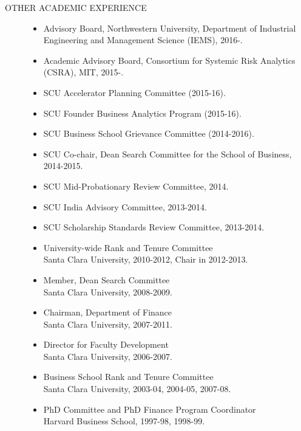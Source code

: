 \documentclass{article}
\begin{document}
\begin{description} 
\item[OTHER ACADEMIC EXPERIENCE] \mbox{}

\begin{itemize}
\setlength\itemsep{-0.1em}

\item Advisory Board, Northwestern University, Department of Industrial Engineering and Management Science (IEMS), 2016-. 

\item Academic Advisory Board, Consortium for Systemic Risk Analytics (CSRA), MIT, 2015-.

\item SCU Accelerator Planning Committee (2015-16). 

\item SCU Founder Business Analytics Program (2015-16). 

\item SCU Business School Grievance Committee (2014-2016). 

\item SCU Co-chair, Dean Search Committee for the School of Business, 2014-2015.

\item SCU Mid-Probationary Review Committee, 2014.

\item SCU India Advisory Committee, 2013-2014.

\item SCU Scholarship Standards Review Committee, 2013-2014.


\item University-wide Rank and Tenure Committee\\
        Santa Clara University, 2010-2012, Chair in 2012-2013.

\item Member, Dean Search Committee\\
	Santa Clara University, 2008-2009.

\item Chairman, Department of Finance\\
	Santa Clara University, 2007-2011.

\item Director for Faculty Development\\
	Santa Clara University, 2006-2007.

\item Business School Rank and Tenure Committee \\
	Santa Clara University, 2003-04, 2004-05, 2007-08.

\item PhD Committee and PhD Finance Program Coordinator\\
        Harvard Business School, 1997-98, 1998-99.
        
\end{itemize}

\end{description}
\end{document}
